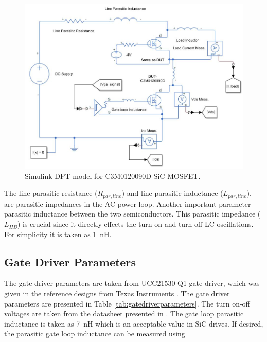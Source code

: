 \documentclass[12pt]{article} %
\begin{document}
\begin{figure}[h!]
	\includegraphics[scale=0.6]{figures/Simulink_circuit.JPG}
	\caption{Simulink DPT model for C3M0120090D SiC MOSFET. }
	\label{fig:simulinkmodel}
\end{figure}

The line parasitic resistance ($R_{par,line}$) and line parasitic inductance ($L_{par,line}$), are parasitic impedances in the AC power loop. Another important parameter parasitic inductance between the two semiconductors. This parasitic impedance ($L_{HB}$) is crucial since it directly effects the turn-on and turn-off LC oscillations. For simplicity it is taken as 1~nH.

\subsection{Gate Driver Parameters}
The gate driver parameters are taken from UCC21530-Q1 gate driver, which was given in the reference designs from Texas Instruments \cite{TI}. The gate driver parameters are presented in Table \ref{tab:gatedriverparameters}. The turn on-off voltages are taken from the datasheet presented in \cite{Cree}. The gate loop parasitic inductance is taken as 7~nH which is an acceptable value in SiC drives. If desired, the parasitic gate loop inductance can be measured using 
\end{document}
